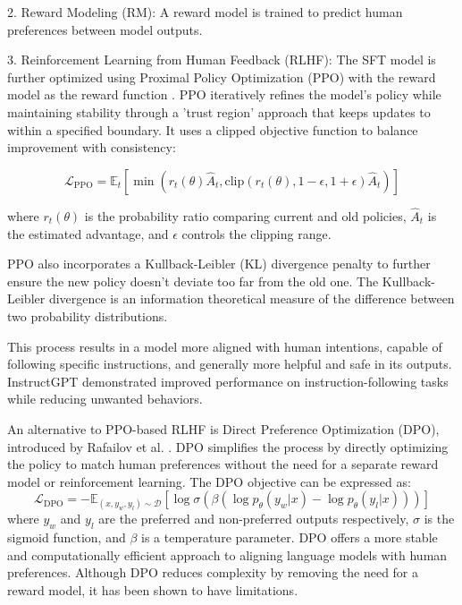 \documentclass[a4paper, oneside]{discothesis}
\begin{document}
2. Reward Modeling (RM): A reward model is trained to predict human preferences between model outputs.

3. Reinforcement Learning from Human Feedback (RLHF): The SFT model is further optimized using Proximal Policy Optimization (PPO) 
with the reward model as the reward function \cite{schulman2017proximal}. PPO iteratively refines the model's policy while maintaining stability through a 'trust region' approach that keeps updates to within a specified boundary. It uses a clipped objective function to balance improvement with consistency:

   \[\mathcal{L}_{\text{PPO}} = \mathbb{E}_t[\min(r_t(\theta)\hat{A}_t, \text{clip}(r_t(\theta), 1-\epsilon, 1+\epsilon)\hat{A}_t)]\]

   where $r_t(\theta)$ is the probability ratio comparing current and old policies, $\hat{A}_t$ is the estimated advantage, and $\epsilon$ controls the clipping range.

PPO also incorporates a Kullback-Leibler (KL) divergence penalty to further ensure the new policy doesn't deviate too far from the old one. The Kullback-Leibler divergence is an information theoretical measure of the difference between two probability distributions.

This process results in a model more aligned with human intentions, capable of following specific instructions, and generally more helpful and safe in its outputs. InstructGPT demonstrated improved performance on instruction-following tasks while reducing unwanted behaviors.

An alternative to PPO-based RLHF is Direct Preference Optimization (DPO), introduced by Rafailov et al. \cite{rafailov2023direct}. 
DPO simplifies the process by directly optimizing the policy to match human preferences without the need for a separate reward model or reinforcement learning. 
The DPO objective can be expressed as:
\[\mathcal{L}_{\text{DPO}} = -\mathbb{E}_{(x,y_w,y_l)\sim \mathcal{D}}[\log \sigma(\beta(\log p_\theta(y_w|x) - \log p_\theta(y_l|x)))]\]
where $y_w$ and $y_l$ are the preferred and non-preferred outputs respectively, $\sigma$ is the sigmoid function, and $\beta$ is a temperature parameter. DPO offers a more stable and computationally efficient approach to aligning language models with human preferences. Although DPO reduces complexity by removing the need for a reward model, it has been shown to have limitations. \cite{dposuperiortoppo_xu}
\end{document}
